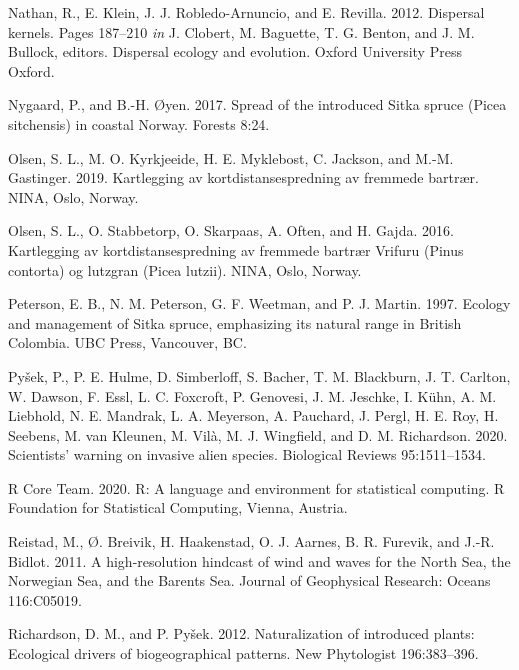 \documentclass[
]{article}
\begin{document}
\leavevmode\hypertarget{ref-nathanDispersalKernels2012}{}%
Nathan, R., E. Klein, J. J. Robledo-Arnuncio, and E. Revilla. 2012. Dispersal kernels. Pages 187--210 \emph{in} J. Clobert, M. Baguette, T. G. Benton, and J. M. Bullock, editors. Dispersal ecology and evolution. Oxford University Press Oxford.

\leavevmode\hypertarget{ref-nygaardSpreadIntroducedSitka2017}{}%
Nygaard, P., and B.-H. Øyen. 2017. Spread of the introduced Sitka spruce (Picea sitchensis) in coastal Norway. Forests 8:24.

\leavevmode\hypertarget{ref-olsenKartleggingAvKortdistansespredning2019}{}%
Olsen, S. L., M. O. Kyrkjeeide, H. E. Myklebost, C. Jackson, and M.-M. Gastinger. 2019. Kartlegging av kortdistansespredning av fremmede bartrær. NINA, Oslo, Norway.

\leavevmode\hypertarget{ref-olsenKartleggingAvKortdistansespredning2016}{}%
Olsen, S. L., O. Stabbetorp, O. Skarpaas, A. Often, and H. Gajda. 2016. Kartlegging av kortdistansespredning av fremmede bartrær Vrifuru (Pinus contorta) og lutzgran (Picea lutzii). NINA, Oslo, Norway.

\leavevmode\hypertarget{ref-petersonEcologyManagementSitka1997}{}%
Peterson, E. B., N. M. Peterson, G. F. Weetman, and P. J. Martin. 1997. Ecology and management of Sitka spruce, emphasizing its natural range in British Colombia. UBC Press, Vancouver, BC.

\leavevmode\hypertarget{ref-pysekScientistsWarningInvasive2020}{}%
Pyšek, P., P. E. Hulme, D. Simberloff, S. Bacher, T. M. Blackburn, J. T. Carlton, W. Dawson, F. Essl, L. C. Foxcroft, P. Genovesi, J. M. Jeschke, I. Kühn, A. M. Liebhold, N. E. Mandrak, L. A. Meyerson, A. Pauchard, J. Pergl, H. E. Roy, H. Seebens, M. van Kleunen, M. Vilà, M. J. Wingfield, and D. M. Richardson. 2020. Scientists' warning on invasive alien species. Biological Reviews 95:1511--1534.

\leavevmode\hypertarget{ref-rcoreteamLanguageEnvironmentStatistical2020}{}%
R Core Team. 2020. R: A language and environment for statistical computing. R Foundation for Statistical Computing, Vienna, Austria.

\leavevmode\hypertarget{ref-reistadHighresolutionHindcastWind2011}{}%
Reistad, M., Ø. Breivik, H. Haakenstad, O. J. Aarnes, B. R. Furevik, and J.-R. Bidlot. 2011. A high-resolution hindcast of wind and waves for the North Sea, the Norwegian Sea, and the Barents Sea. Journal of Geophysical Research: Oceans 116:C05019.

\leavevmode\hypertarget{ref-richardsonNaturalizationIntroducedPlants2012}{}%
Richardson, D. M., and P. Pyšek. 2012. Naturalization of introduced plants: Ecological drivers of biogeographical patterns. New Phytologist 196:383--396.
\end{document}
